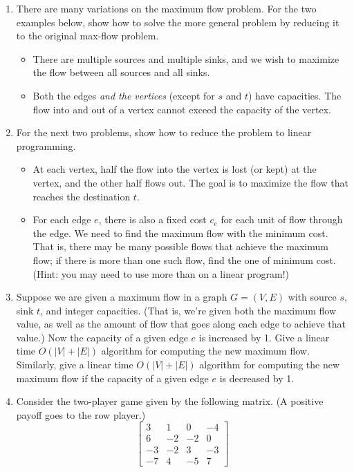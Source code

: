 \documentclass[tikz, 12pt]{scrartcl}
\begin{document}
\begin{enumerate}
	\item There are many variations on the maximum flow problem. For the two examples below, show how to solve the more general problem by reducing it to the original max-flow problem.
	
	\begin{itemize}
		\item There are multiple sources and multiple sinks, and we wish to maximize the flow between all sources and all sinks.
		\item Both the edges \textit{and the vertices} (except for $s$ and $t$) have capacities. The flow into and out of a vertex cannot exceed the capacity of the vertex.
	\end{itemize}
	
	\item For the next two problems, show how to reduce the problem to linear programming.
	\begin{itemize}
		\item At each vertex, half the flow into the vertex is lost (or kept) at the vertex, and the other half flows out. The goal is to maximize the flow that reaches the destination $t$.
		\item For each edge $e$, there is also a fixed cost $c_e$ for each unit of flow through the edge. We need to find the maximum flow with the minimum cost. That is, there may be many possible flows that achieve the maximum flow; if there is more than one such flow, find the one of minimum cost. (Hint: you may need to use more than on a linear program!)
	\end{itemize}
	
	\item Suppose we are given a maximum flow in a graph $G=(V, E)$ with source $s$, sink $t$, and integer capacities. (That is, we're given both the maximum flow value, as well as the amount of flow that goes along each edge to achieve that value.) Now the capacity of a given edge $e$ is increased by 1. Give a linear time $O(|V| + |E|)$  algorithm for computing the new maximum flow. Similarly, give a linear time $O(|V| + |E|)$ algorithm for computing the new maximum flow if the capacity of a given edge $e$ is decreased by 1.
	
	\item Consider the two-player game given by the following matrix. (A positive payoff goes to the row player.)
	$$
	\left[
	\begin{array}{cccc}
	3	&	1	&	0	&	-4\\
	6	&	-2	&	-2	&	0\\
	-3	&	-2	&	3	&	-3\\
	-7	&	4	&	-5	&	7
	\end{array}
	\right]	
	$$
	

\end{enumerate}
\end{document}
